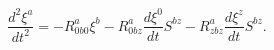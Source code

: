 \begin{equation}
\frac{d^{2}\xi ^{a}}{dt^{2}}=-R_{0b0}^{a}\xi ^{b}-R_{0bz}^{a}\frac{d\xi ^{0}%
}{dt}S^{bz}-R_{zbz}^{a}\frac{d\xi ^{z}}{dt}S^{bz}.  \label{48}
\end{equation}

